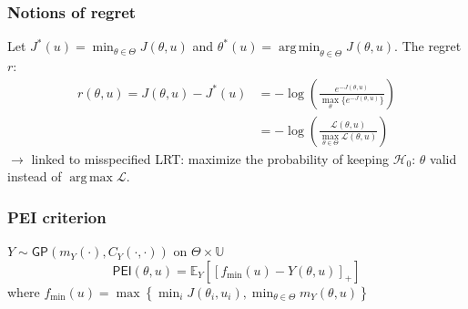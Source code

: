 \documentclass[11pt]{beamer}
\newcommand{\Ex}{\mathbb{E}}
\newcommand{\GP}{\mathsf{GP}}
\DeclareMathOperator*{\argmin}{arg\,min}
\DeclareMathOperator*{\argmax}{arg\,max}
\newcommand{\kk}{\theta}
\newcommand{\uu}{u}
\newcommand{\Uspace}{\mathbb{U}}
\newcommand{\Kspace}{\Theta}
\begin{document}
\begin{frame}
  \frametitle{Notions of regret}
  Let $J^*(\uu) = \min_{\kk \in \Kspace} J(\kk, \uu)$ and $\kk^*(\uu) = \argmin_{\kk\in\Kspace} J(\kk, \uu)$.
  The regret $r$:
  \begin{align}
    r(\kk, \uu) = J(\kk, \uu) - J^*(\uu) &= -\log \left(\frac{e^{-J(\kk, \uu)}}{\max_{\kk}\{   e^{-J(\kk, \uu)}\}}\right) \\
                                         &= - \log \left(\frac{\mathcal{L}(\kk, \uu)}{\max_{\kk\in\Kspace} \mathcal{L}(\kk, \uu)}\right)
  \end{align}
  $\rightarrow$ linked to misspecified LRT: maximize the probability of keeping $\mathcal{H}_0$: $\kk$ valid instead of $\argmax \mathcal{L}$.
\end{frame}
\begin{frame}
  \frametitle{PEI criterion}
  $Y \sim \GP(m_Y(\cdot), C_Y(\cdot, \cdot))$ on $\Kspace \times \Uspace$
  \begin{equation}
    \mathsf{PEI}(\kk, \uu) = \Ex_{Y}\left[ \left[f_{\min}(\uu) - Y(\kk, \uu)\right]_+\right]
  \end{equation}
where $f_{\min}(\uu) = \max\left\{\min_i J(\kk_i, \uu_i), \min_{\kk\in\Kspace} m_Y(\kk, \uu)\right\}$
  
\end{frame}
\end{document}
